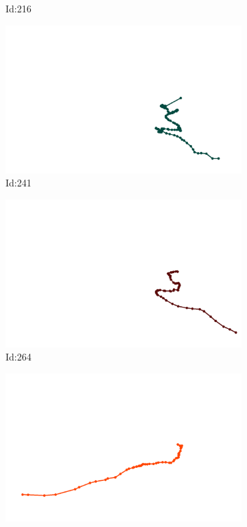 \documentclass[12pt,twoside]{report}
\begin{document}
\begin{figure}
\begin{subfigure}[b]{0.20\textwidth}
\caption{Id:216}
\end{subfigure}
\begin{subfigure}[b]{0.20\textwidth}
\centering
\includegraphics[width=\textwidth]{../trajectories/241.png}
\caption{Id:241}
\end{subfigure}
\begin{subfigure}[b]{0.20\textwidth}
\centering
\includegraphics[width=\textwidth]{../trajectories/264.png}
\caption{Id:264}
\end{subfigure}
\begin{subfigure}[b]{0.20\textwidth}
\centering
\includegraphics[width=\textwidth]{../trajectories/363.png}

\end{subfigure}
\end{figure}
\end{document}
